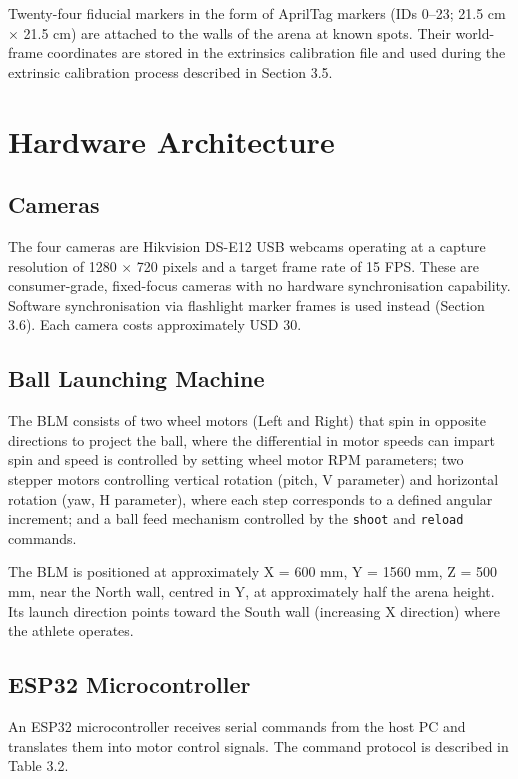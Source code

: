 Twenty-four fiducial markers in the form of AprilTag markers (IDs 0--23; 21.5 cm $\times$ 21.5 cm) are attached to the walls of the arena at known spots. Their world-frame coordinates are stored in the extrinsics calibration file and used during the extrinsic calibration process described in Section 3.5.

\section{Hardware Architecture}

\subsection{Cameras}

The four cameras are Hikvision DS-E12 USB webcams operating at a capture resolution of 1280 $\times$ 720 pixels and a target frame rate of 15 FPS. These are consumer-grade, fixed-focus cameras with no hardware synchronisation capability. Software synchronisation via flashlight marker frames is used instead (Section 3.6). Each camera costs approximately USD 30.

\subsection{Ball Launching Machine}

The BLM consists of two wheel motors (Left and Right) that spin in opposite directions to project the ball, where the differential in motor speeds can impart spin and speed is controlled by setting wheel motor RPM parameters; two stepper motors controlling vertical rotation (pitch, V parameter) and horizontal rotation (yaw, H parameter), where each step corresponds to a defined angular increment; and a ball feed mechanism controlled by the \texttt{shoot} and \texttt{reload} commands.

The BLM is positioned at approximately X = 600 mm, Y = 1560 mm, Z = 500 mm, near the North wall, centred in Y, at approximately half the arena height. Its launch direction points toward the South wall (increasing X direction) where the athlete operates.

\subsection{ESP32 Microcontroller}

An ESP32 microcontroller receives serial commands from the host PC and translates them into motor control signals. The command protocol is described in Table 3.2.

